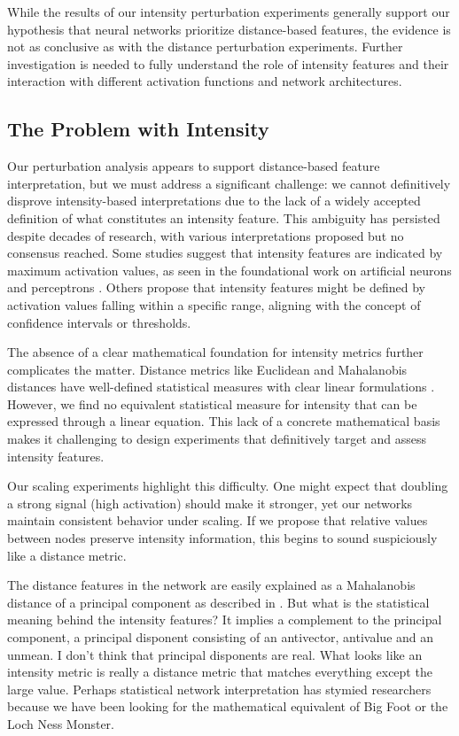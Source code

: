 While the results of our intensity perturbation experiments generally support our hypothesis that neural networks prioritize distance-based features, the evidence is not as conclusive as with the distance perturbation experiments. Further investigation is needed to fully understand the role of intensity features and their interaction with different activation functions and network architectures.

\subsection{The Problem with Intensity}

Our perturbation analysis appears to support distance-based feature interpretation, but we must address a significant challenge: we cannot definitively disprove intensity-based interpretations due to the lack of a widely accepted definition of what constitutes an intensity feature. This ambiguity has persisted despite decades of research, with various interpretations proposed but no consensus reached. Some studies suggest that intensity features are indicated by maximum activation values, as seen in the foundational work on artificial neurons and perceptrons \cite{mcculloch1943logical, rosenblatt1958perceptron}. Others propose that intensity features might be defined by activation values falling within a specific range, aligning with the concept of confidence intervals or thresholds.

The absence of a clear mathematical foundation for intensity metrics further complicates the matter. Distance metrics like Euclidean and Mahalanobis distances have well-defined statistical measures with clear linear formulations \cite{deza2009encyclopedia, mahalanobis1936generalized}. However, we find no equivalent statistical measure for intensity that can be expressed through a linear equation. This lack of a concrete mathematical basis makes it challenging to design experiments that definitively target and assess intensity features.

Our scaling experiments highlight this difficulty. One might expect that doubling a strong signal (high activation) should make it stronger, yet our networks maintain consistent behavior under scaling. If we propose that relative values between nodes preserve intensity information, this begins to sound suspiciously like a distance metric.

The distance features in the network are easily explained as a Mahalanobis distance of a principal component as described in \cite{oursland2024interpreting}. But what is the statistical meaning behind the intensity features? It implies a complement to the principal component, a principal disponent consisting of an antivector, antivalue and an unmean. I don't think that principal disponents are real. What looks like an intensity metric is really a distance metric that matches everything except the large value. Perhaps statistical network interpretation has stymied researchers because we have been looking for the mathematical equivalent of Big Foot or the Loch Ness Monster.
